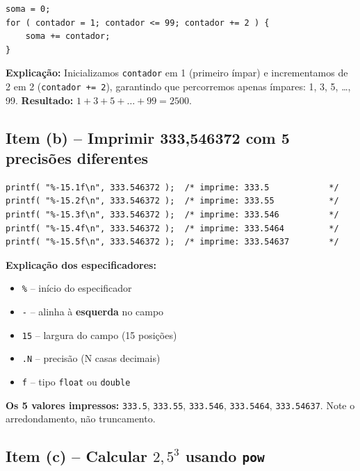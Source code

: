 \documentclass[12pt,a4paper]{article}
\begin{document}
\begin{respostabox}
\begin{lstlisting}
soma = 0;
for ( contador = 1; contador <= 99; contador += 2 ) {
    soma += contador;
}
\end{lstlisting}
\textbf{Explicação:} Inicializamos \texttt{contador} em 1 (primeiro ímpar) e
incrementamos de 2 em 2 (\texttt{contador += 2}), garantindo que percorremos
apenas ímpares: 1, 3, 5, \ldots, 99. \textbf{Resultado:} $1 + 3 + 5 + \ldots + 99 = 2500$.
\end{respostabox}

\subsection*{Item (b) -- Imprimir 333,546372 com 5 precisões diferentes}

\begin{respostabox}
\begin{lstlisting}
printf( "%-15.1f\n", 333.546372 );  /* imprime: 333.5            */
printf( "%-15.2f\n", 333.546372 );  /* imprime: 333.55           */
printf( "%-15.3f\n", 333.546372 );  /* imprime: 333.546          */
printf( "%-15.4f\n", 333.546372 );  /* imprime: 333.5464         */
printf( "%-15.5f\n", 333.546372 );  /* imprime: 333.54637        */
\end{lstlisting}
\textbf{Explicação dos especificadores:}
\begin{itemize}[noitemsep]
  \item \texttt{\%} -- início do especificador
  \item \texttt{-} -- alinha à \textbf{esquerda} no campo
  \item \texttt{15} -- largura do campo (15 posições)
  \item \texttt{.N} -- precisão (N casas decimais)
  \item \texttt{f} -- tipo \texttt{float} ou \texttt{double}
\end{itemize}

\textbf{Os 5 valores impressos:} \texttt{333.5}, \texttt{333.55}, \texttt{333.546},
\texttt{333.5464}, \texttt{333.54637}. Note o arredondamento, não truncamento.
\end{respostabox}

\subsection*{Item (c) -- Calcular $2{,}5^3$ usando \texttt{pow}}
\end{document}
